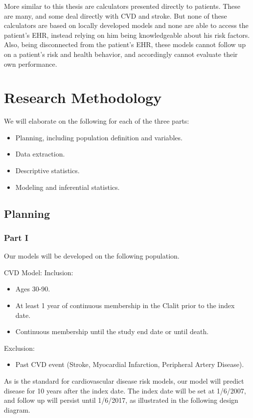 \documentclass[a4paper,12pt]{article}
\begin{document}
	More similar to this thesis are calculators presented directly to patients. These are many, and some deal directly with CVD and stroke\cite{Parmar2015}. But none of these calculators are based on locally developed models and none are able to access the patient's EHR, instead relying on him being knowledgeable about his risk factors. Also, being disconnected from the patient's EHR, these models cannot follow up on a patient's risk and health behavior, and accordingly cannot evaluate their own performance.
	
	\section{Research Methodology}
	We will elaborate on the following for each of the three parts:
	\begin{itemize}
		\item Planning, including population definition and variables.
		\item Data extraction.
		\item Descriptive statistics.
		\item Modeling and inferential statistics.
	\end{itemize}

	\subsection{Planning}
	
		\subsubsection{Part I}
		Our models will be developed on the following population.
		
		CVD Model:
		Inclusion:
		\begin{itemize}
			\item Ages 30-90.
			\item At least 1 year of continuous membership in the Clalit prior to the index date.
			\item Continuous membership until the study end date or until death.
		\end{itemize}
		Exclusion:
		\begin{itemize}
			\item Past CVD event (Stroke, Myocardial Infarction, Peripheral Artery Disease).
		\end{itemize}
		
		As is the standard for cardiovascular disease risk models, our model will predict disease for 10 years after the index date. The index date will be set at 1/6/2007, and follow up will persist until 1/6/2017, as illustrated in the following design diagram.
		
\end{document}
